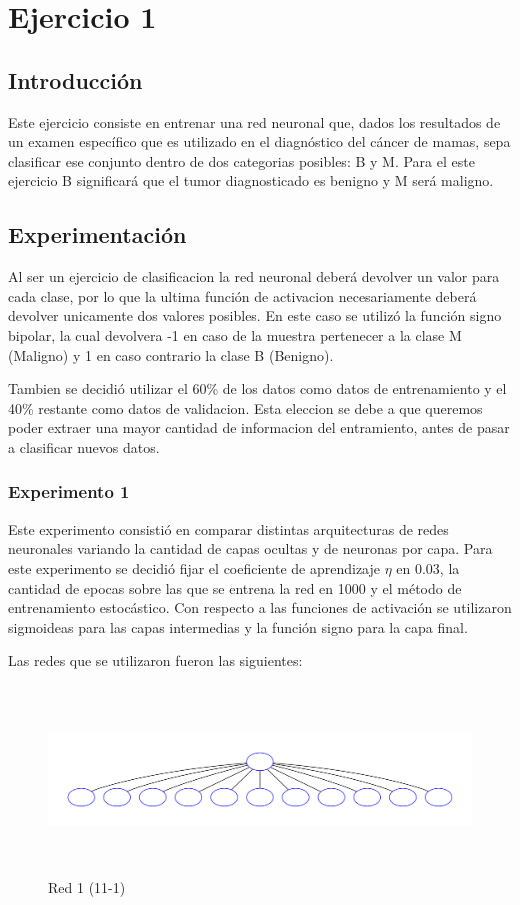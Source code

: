 \section{Ejercicio 1}

\subsection{Introducción}
Este ejercicio consiste en entrenar una red neuronal que, dados los resultados de un examen específico que es utilizado en el diagnóstico del
cáncer de mamas, sepa clasificar ese conjunto dentro de dos categorias posibles: B y M. Para el este ejercicio B significará que el tumor diagnosticado
es benigno y M será maligno.

\subsection{Experimentación}
Al ser un ejercicio de clasificacion la red neuronal deberá devolver un valor para cada clase, por lo que la ultima función de activacion necesariamente
deberá devolver unicamente dos valores posibles. En este caso se utilizó la función signo bipolar, la cual devolvera -1 en caso de la muestra pertenecer
a la clase M (Maligno) y 1 en caso contrario la clase B (Benigno).

Tambien se decidió utilizar el 60\% de los datos como datos de entrenamiento y el 40\% restante como datos de validacion. Esta eleccion se debe a que
queremos poder extraer una mayor cantidad de informacion del entramiento, antes de pasar a clasificar nuevos datos.

\subsubsection{Experimento 1}
Este experimento consistió en comparar distintas arquitecturas de redes neuronales variando la cantidad de capas ocultas y de neuronas por capa.
Para este experimento se decidió fijar el coeficiente de aprendizaje $\eta$ en 0.03, la cantidad de epocas sobre las que se entrena la red en 1000 y el
método de entrenamiento estocástico. Con respecto a las funciones de activación se utilizaron sigmoideas para las capas intermedias y la función signo
para la capa final.

Las redes que se utilizaron fueron las siguientes:

\begin{figure}[H]
  \includegraphics[width=12cm, height=5cm]{../plot/11-1.pdf}
  \centering
  \caption{Red 1 (11-1)}
\end{figure}

